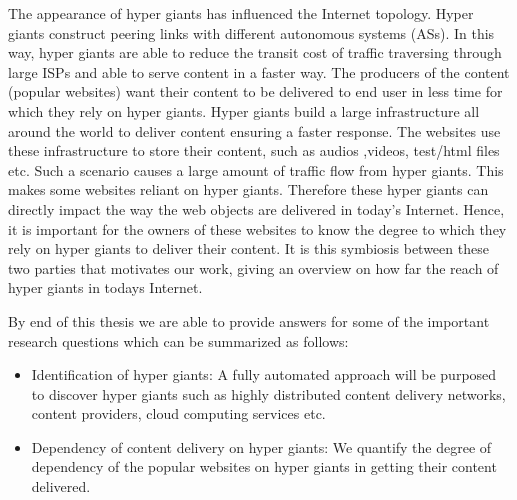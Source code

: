 \noindent The appearance of hyper giants has influenced the Internet topology. Hyper giants construct peering links with different autonomous systems (ASs). In this way, hyper giants are able to reduce the transit cost of traffic traversing through large ISPs and able to serve content in a faster way. The producers of the content (popular websites) want their content to be delivered to end user in less time for which they rely on hyper giants. Hyper giants build a large infrastructure all around the world to deliver content ensuring a faster response. The websites use these infrastructure to store their content, such as audios ,videos, test/html files etc. Such a scenario causes a large amount of traffic flow from hyper giants. This makes some websites reliant on hyper giants. Therefore these hyper giants can directly impact the way the web objects are delivered in today's Internet. Hence, it is important for the owners of these websites to know the degree to which they rely on hyper giants to deliver their content. It is this symbiosis between these two parties that motivates our work, giving an overview on how far the reach of hyper giants in todays Internet.\\

\clearpage

\noindent By end of this thesis we are able to provide answers for some of the important research questions which can be summarized as follows:\\

\begin{itemize}
\item Identification of hyper giants: A fully automated approach will be purposed to discover hyper giants such as highly distributed content delivery networks, content providers, cloud computing services etc.
\item Dependency of content delivery on hyper giants: We quantify the degree of dependency
of the popular websites on hyper giants in getting their content delivered.
\end{itemize}


